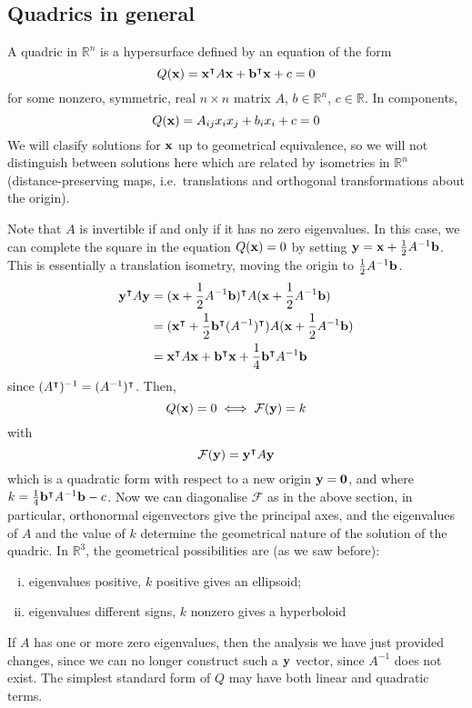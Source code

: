 \subsection{Quadrics in general}
A quadric in \(\mathbb R^n\) is a hypersurface defined by an equation of the form
\[
	Q(\vb x) = \vb x^\intercal A \vb x + \vb b^\intercal \vb x + c = 0
\]
for some nonzero, symmetric, real \(n \times n\) matrix \(A\), \(b \in \mathbb R^n\), \(c \in \mathbb R\).
In components,
\[
	Q(\vb x) = A_{ij}x_i x_j + b_i x_i + c = 0
\]
We will clasify solutions for \(\vb x\) up to geometrical equivalence, so we will not distinguish between solutions here which are related by isometries in \(\mathbb R^n\) (distance-preserving maps, i.e.\ translations and orthogonal transformations about the origin).

Note that \(A\) is invertible if and only if it has no zero eigenvalues.
In this case, we can complete the square in the equation \(Q(\vb x) = 0\) by setting \(\vb y = \vb x + \frac{1}{2}A^{-1} \vb b\).
This is essentially a translation isometry, moving the origin to \(\frac{1}{2}A^{-1} \vb b\).
\begin{align*}
	\vb y^\intercal A \vb y & = (\vb x + \frac{1}{2}A^{-1}\vb b)^\intercal A (\vb x + \frac{1}{2}A^{-1}\vb b)                         \\
	                         & = (\vb x^\intercal + \frac{1}{2}\vb b^\intercal(A^{-1})^\intercal) A (\vb x + \frac{1}{2}A^{-1}\vb b) \\
	                         & = \vb x^\intercal A \vb x + \vb b^\intercal \vb x + \frac{1}{4}\vb b^\intercal A^{-1}\vb b
\end{align*}
since \((A^\intercal)^{-1} = (A^{-1})^\intercal\).
Then,
\[
	Q(\vb x) = 0 \iff \mathcal F(\vb y) = k
\]
with
\[
	\mathcal F(\vb y) = \vb y^\intercal A \vb y
\]
which is a quadratic form with respect to a new origin \(\vb y = \vb 0\), and where \(k = \frac{1}{4}\vb b^\intercal A^{-1}\vb b - c\).
Now we can diagonalise \(\mathcal F\) as in the above section, in particular, orthonormal eigenvectors give the principal axes, and the eigenvalues of \(A\) and the value of \(k\) determine the geometrical nature of the solution of the quadric.
In \(\mathbb R^3\), the geometrical possibilities are (as we saw before):
\begin{enumerate}[(i)]
	\item eigenvalues positive, \(k\) positive gives an ellipsoid;
	\item eigenvalues different signs, \(k\) nonzero gives a hyperboloid
\end{enumerate}
If \(A\) has one or more zero eigenvalues, then the analysis we have just provided changes, since we can no longer construct such a \(\vb y\) vector, since \(A^{-1}\) does not exist.
The simplest standard form of \(Q\) may have both linear and quadratic terms.

